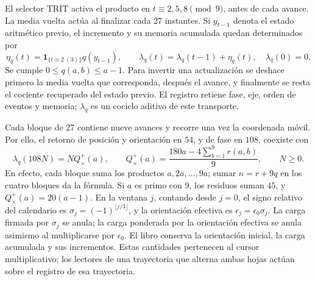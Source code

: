 El selector TRIT activa el producto en \(t\equiv2,5,8\pmod9\),
antes de cada avance. La media vuelta actúa al finalizar cada
\(27\) instantes. Si \(y_{t-1}\) denota el estado aritmético
previo, el incremento y su memoria acumulada quedan determinados por
\begin{equation}
 \eta_q(t)=\mathbf1_{\{t\equiv2\ (3)\}}q(y_{t-1}),\qquad
 \lambda_q(t)=\lambda_q(t-1)+\eta_q(t),\quad \lambda_q(0)=0.
 \label{prd-arit:incremento}
\end{equation}
Se cumple \(0\leq q(a,b)\leq a-1\). Para invertir una
actualización se deshace primero la media vuelta que corresponda,
después el avance, y finalmente se resta el cociente recuperado del
estado previo. El registro retiene fase, eje, orden de eventos y
memoria; \(\lambda_q\) es un cociclo aditivo de este transporte.

Cada bloque de \(27\) contiene nueve avances y recorre una vez
la coordenada móvil. Por ello, el retorno de posición y orientación
en \(54\), y de fase en \(108\), coexiste con
\begin{equation}
 \lambda_q(108N)=NQ_\times^+(a),\qquad
 Q_\times^+(a)=\frac{180a-4\sum_{b=1}^9r(a,b)}9,
 \qquad N\geq0.
 \label{prd-arit:retorno}
\end{equation}
En efecto, cada bloque suma los productos \(a,2a,\ldots,9a\);
sumar \(n=r+9q\) en los cuatro bloques da la fórmula. Si
\(a\) es primo con \(9\), los residuos suman \(45\), y
\(Q_\times^+(a)=20(a-1)\). En la ventana \(j\), contando desde
\(j=0\), el signo relativo del calendario es
\(\sigma_j=(-1)^{\lfloor j/3\rfloor}\), y la orientación
efectiva es \(\epsilon_j=\epsilon_0\sigma_j\).
La carga firmada por \(\sigma_j\) se anula; la carga ponderada
por la orientación efectiva se anula asimismo al multiplicarse por
\(\epsilon_0\). El libro conserva la orientación inicial, la carga
acumulada y sus incrementos. Estas cantidades pertenecen
al cursor multiplicativo; los lectores de una trayectoria que
alterna ambas hojas actúan sobre el registro de esa trayectoria.
